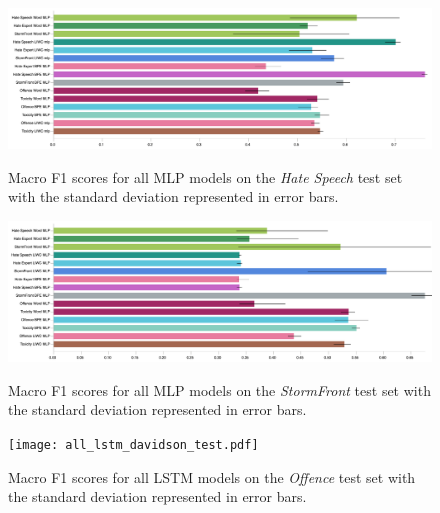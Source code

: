 \begin{figure}
\begin{minipage}{\textwidth}
\centering
  \includegraphics[width=\textwidth]{all_mlp_waseem_hovy_test.pdf}
  \caption{Macro F1 scores for all MLP models on the \textit{Hate Speech} test set with the standard deviation represented in error bars.}
  \label{fig:waseem_hovy_mlp_test}
\vfill
  \includegraphics[width=\textwidth]{all_mlp_garcia_test.pdf}
  \caption{Macro F1 scores for all MLP models on the \textit{StormFront} test set with the standard deviation represented in error bars.}
  \label{fig:garcia_mlp_test}
  \vfill
    \texttt{[image: all\_lstm\_davidson\_test.pdf]}
    \caption{Macro F1 scores for all LSTM models on the \textit{Offence} test set with the standard deviation represented in error bars.}
    \label{fig:davidson_lstm_test}
  \end{minipage}
\end{figure}

